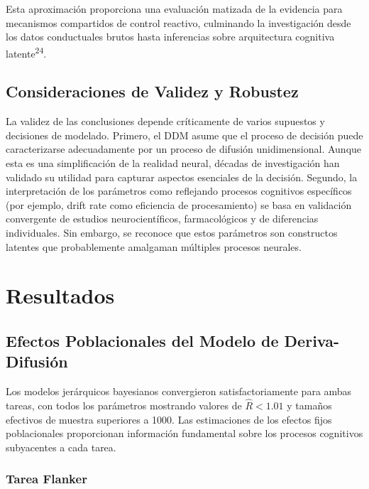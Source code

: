 \documentclass[
  spanish,
  10pt,
]{article}
\begin{document}
Esta aproximación proporciona una evaluación matizada de la evidencia
para mecanismos compartidos de control reactivo, culminando la
investigación desde los datos conductuales brutos hasta inferencias
sobre arquitectura cognitiva latente\textsuperscript{24}.

\subsection{Consideraciones de Validez y
Robustez}\label{consideraciones-de-validez-y-robustez}

La validez de las conclusiones depende críticamente de varios supuestos
y decisiones de modelado. Primero, el DDM asume que el proceso de
decisión puede caracterizarse adecuadamente por un proceso de difusión
unidimensional. Aunque esta es una simplificación de la realidad neural,
décadas de investigación han validado su utilidad para capturar aspectos
esenciales de la decisión. Segundo, la interpretación de los parámetros
como reflejando procesos cognitivos específicos (por ejemplo, drift rate
como eficiencia de procesamiento) se basa en validación convergente de
estudios neurocientíficos, farmacológicos y de diferencias individuales.
Sin embargo, se reconoce que estos parámetros son constructos latentes
que probablemente amalgaman múltiples procesos neurales.

\section{Resultados}\label{resultados}

\subsection{Efectos Poblacionales del Modelo de
Deriva-Difusión}\label{efectos-poblacionales-del-modelo-de-deriva-difusiuxf3n}

Los modelos jerárquicos bayesianos convergieron satisfactoriamente para
ambas tareas, con todos los parámetros mostrando valores de
\(\hat{R} < 1.01\) y tamaños efectivos de muestra superiores a 1000. Las
estimaciones de los efectos fijos poblacionales proporcionan información
fundamental sobre los procesos cognitivos subyacentes a cada tarea.

\subsubsection{Tarea Flanker}\label{tarea-flanker}
\end{document}
